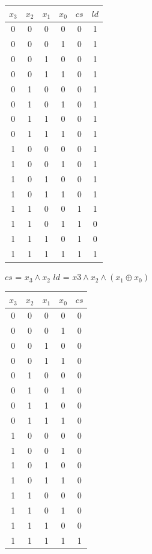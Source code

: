 \documentclass[a4paper,10pt]{article}
\begin{document}
\begin{tabular}{c c c c| c c}
$x_3$ & $x_2$ & $x_1$ & $x_0$ & $cs$ & $ld$ \\\hline
0 & 0 & 0 & 0 & 0 & 1 \\
0 & 0 & 0 & 1 & 0 & 1 \\
0 & 0 & 1 & 0 & 0 & 1 \\
0 & 0 & 1 & 1 & 0 & 1 \\
0 & 1 & 0 & 0 & 0 & 1 \\
0 & 1 & 0 & 1 & 0 & 1 \\
0 & 1 & 1 & 0 & 0 & 1 \\
0 & 1 & 1 & 1 & 0 & 1 \\
1 & 0 & 0 & 0 & 0 & 1 \\
1 & 0 & 0 & 1 & 0 & 1 \\
1 & 0 & 1 & 0 & 0 & 1 \\
1 & 0 & 1 & 1 & 0 & 1 \\
1 & 1 & 0 & 0 & 1 & 1 \\
1 & 1 & 0 & 1 & 1 & 0 \\
1 & 1 & 1 & 0 & 1 & 0 \\
1 & 1 & 1 & 1 & 1 & 1 \\
\end{tabular}

$cs$ = $x_3 \wedge x_2$
$ld$ = $x3 \wedge x_2 \wedge (x_1 \oplus x_0)$


\begin{tabular}{c c c c| c}
$x_3$ & $x_2$ & $x_1$ & $x_0$ & $cs$ \\\hline
0 & 0 & 0 & 0 & 0 \\
0 & 0 & 0 & 1 & 0 \\
0 & 0 & 1 & 0 & 0 \\
0 & 0 & 1 & 1 & 0 \\
0 & 1 & 0 & 0 & 0 \\
0 & 1 & 0 & 1 & 0 \\
0 & 1 & 1 & 0 & 0 \\
0 & 1 & 1 & 1 & 0 \\
1 & 0 & 0 & 0 & 0 \\
1 & 0 & 0 & 1 & 0 \\
1 & 0 & 1 & 0 & 0 \\
1 & 0 & 1 & 1 & 0 \\
1 & 1 & 0 & 0 & 0 \\
1 & 1 & 0 & 1 & 0 \\
1 & 1 & 1 & 0 & 0 \\
1 & 1 & 1 & 1 & 1 \\
\end{tabular}
\end{document}
